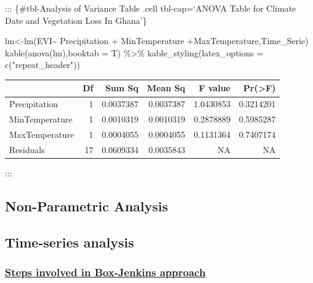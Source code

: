 \documentclass[
  onepage,
  openany]{scrbook}
\newenvironment{Shaded}{}{}
\newcommand{\AttributeTok}[1]{\textcolor[rgb]{0.49,0.56,0.16}{#1}}
\newcommand{\FunctionTok}[1]{\textcolor[rgb]{0.02,0.16,0.49}{#1}}
\newcommand{\NormalTok}[1]{#1}
\newcommand{\OtherTok}[1]{\textcolor[rgb]{0.00,0.44,0.13}{#1}}
\newcommand{\SpecialCharTok}[1]{\textcolor[rgb]{0.25,0.44,0.63}{#1}}
\newcommand{\StringTok}[1]{\textcolor[rgb]{0.25,0.44,0.63}{#1}}
\begin{document}
::: \{\#tbl-Analysis of Variance Table .cell tbl-cap=`ANOVA Table for
Climate Date and Vegetation Loss In Ghana'\}

\begin{Shaded}
\begin{Highlighting}[]
\NormalTok{lm}\OtherTok{\textless{}{-}}\FunctionTok{lm}\NormalTok{(EVI}\SpecialCharTok{\textasciitilde{}}\NormalTok{ Precipitation }\SpecialCharTok{+}\NormalTok{ MinTemperature }\SpecialCharTok{+}\NormalTok{MaxTemperature,Time\_Serie)}
\FunctionTok{kable}\NormalTok{(}\FunctionTok{anova}\NormalTok{(lm),}\AttributeTok{booktab =}\NormalTok{ T) }\SpecialCharTok{\%\textgreater{}\%}
  \FunctionTok{kable\_styling}\NormalTok{(}\AttributeTok{latex\_options =} \FunctionTok{c}\NormalTok{(}\StringTok{"repeat\_header"}\NormalTok{))}
\end{Highlighting}
\end{Shaded}

\begin{table}
\centering
\begin{tabular}{lrrrrr}
\toprule
  & Df & Sum Sq & Mean Sq & F value & Pr(>F)\\
\midrule
Precipitation & 1 & 0.0037387 & 0.0037387 & 1.0430853 & 0.3214201\\
MinTemperature & 1 & 0.0010319 & 0.0010319 & 0.2878889 & 0.5985287\\
MaxTemperature & 1 & 0.0004055 & 0.0004055 & 0.1131364 & 0.7407174\\
Residuals & 17 & 0.0609334 & 0.0035843 & NA & NA\\
\bottomrule
\end{tabular}
\end{table}

:::

\hypertarget{non-parametric-analysis}{%
\subsection{Non-Parametric Analysis}\label{non-parametric-analysis}}

\hypertarget{time-series-analysis}{%
\subsection{\texorpdfstring{\textbf{Time-series
analysis}}{Time-series analysis}}\label{time-series-analysis}}

\hypertarget{steps-involved-in-box-jenkins-approach}{%
\subsubsection{\texorpdfstring{\uline{\textbf{Steps involved in
Box-Jenkins
approach}}}{Steps involved in Box-Jenkins approach}}\label{steps-involved-in-box-jenkins-approach}}
\end{document}
